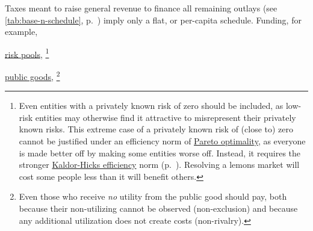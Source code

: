 \begin{description}
	Taxes meant to raise general revenue to finance all remaining outlays (see \autoref{tab:base-n-schedule}, p.~\pageref{tab:base-n-schedule}) imply only a flat, or per-capita schedule.
	Funding, for example,
	\begin{inparaenum}
		\item \hyperref[sec:adverse-selection]{risk pools},
		\footnote{
			Even entities with a privately known risk of zero should be included, as low-risk entities may otherwise find it attractive to misrepresent their privately known risks.
			This extreme case of a privately known risk of (close to) zero cannot be justified under an efficiency norm of \hyperref[sec:pareto]{Pareto optimality}, as everyone is made better off by making some entities worse off.
			Instead, it requires the stronger \hyperref[sec:kaldor-hicks]{Kaldor-Hicks efficiency} norm (p.~\pageref{sec:tax-optimality})\citep{Kaldor1939,Hicks1939}.
			Resolving a lemons market will cost some people less than it will benefit others.
		}
		\item \hyperref[sec:public-good]{public goods},
		\footnote{
			Even those who receive \emph{no} utility from the public good should pay, both because their non-utilizing cannot be observed (non-exclusion) and because any additional utilization does not create costs (non-rivalry).
}
\end{inparaenum}
\end{description}
